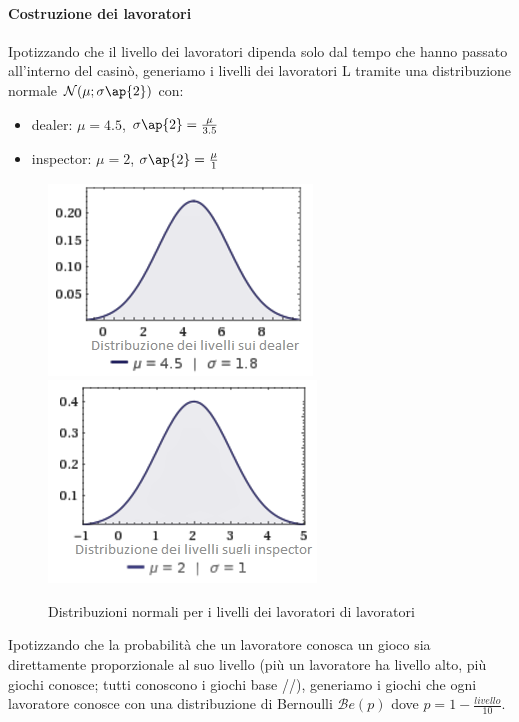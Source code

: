     \paragraph{Costruzione dei lavoratori} Ipotizzando che il livello dei lavoratori dipenda solo dal tempo che hanno passato all'interno del casinò, generiamo i livelli dei lavoratori L tramite una distribuzione normale $\mathcal{N}(\mu;\sigma \ap{2})$ con:
    \begin{itemize}
        \item dealer: $\mu = 4.5$, $\sigma \ap{2} = \frac{\mu}{3.5}$
        \item inspector: $\mu = 2$, $\sigma \ap{2} = \frac{\mu}{1}$
    \end{itemize}
     \begin{figure}[!htb]
         \begin{widepage}
             \centering
             \includegraphics[width=.49\textwidth]{../immagini/livelli_dealer.png}\hfil
             \includegraphics[width=.49\textwidth]{../immagini/livelli_insp.png}
             \caption{Distribuzioni normali per i livelli dei lavoratori di lavoratori}
         \end{widepage}
     \end{figure}
     \FloatBarrier
     \noindent
     Ipotizzando che la probabilità che un lavoratore conosca un gioco sia direttamente proporzionale al suo livello (più un lavoratore ha livello alto, più giochi conosce; tutti conoscono i giochi base //), generiamo i giochi che ogni lavoratore conosce con una distribuzione di Bernoulli $\mathcal{B}e(p)$ dove $p = 1 - \frac{livello}{10}$.
